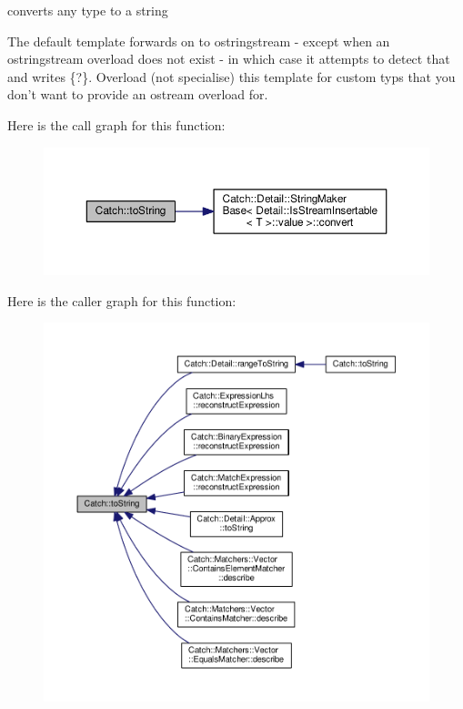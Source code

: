 converts any type to a string 

The default template forwards on to ostringstream -\/ except when an ostringstream overload does not exist -\/ in which case it attempts to detect that and writes \{?\}. Overload (not specialise) this template for custom typs that you don't want to provide an ostream overload for. 

Here is the call graph for this function\-:
\nopagebreak
\begin{figure}[H]
\begin{center}
\leavevmode
\includegraphics[width=350pt]{namespace_catch_a386cb19a84b12339486771ad143a95ae_cgraph}
\end{center}
\end{figure}




Here is the caller graph for this function\-:
\nopagebreak
\begin{figure}[H]
\begin{center}
\leavevmode
\includegraphics[width=350pt]{namespace_catch_a386cb19a84b12339486771ad143a95ae_icgraph}
\end{center}
\end{figure}


